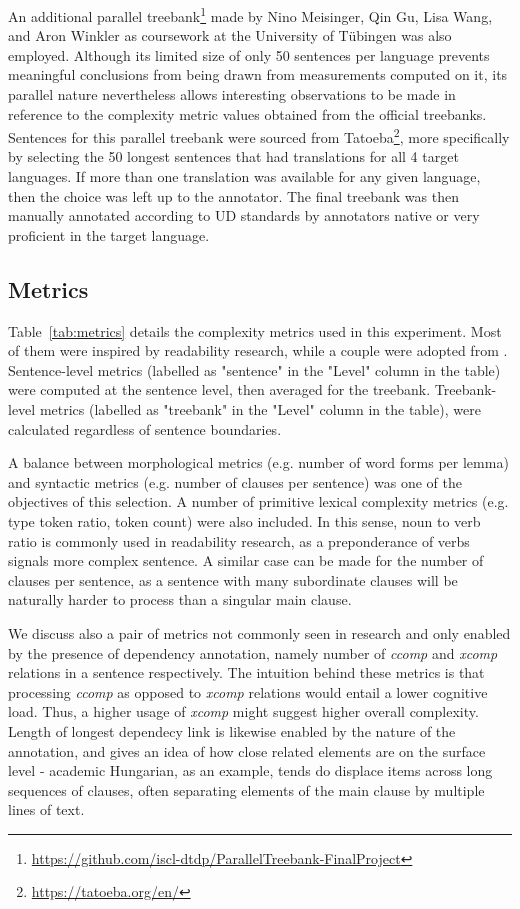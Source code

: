 \documentclass[11pt]{article}
\begin{document}
An additional parallel treebank\footnote{\url{https://github.com/iscl-dtdp/ParallelTreebank-FinalProject}} made by Nino Meisinger, Qin Gu, Lisa Wang, and Aron Winkler as coursework at the University of Tübingen was also employed. Although its limited size of only 50 sentences per language prevents meaningful conclusions from being drawn from measurements computed on it, its parallel nature nevertheless allows interesting observations to be made in reference to the complexity metric values obtained from the official treebanks. Sentences for this parallel treebank were sourced from Tatoeba\footnote{\url{https://tatoeba.org/en/}}, more specifically by selecting the 50 longest sentences that had translations for all 4 target languages. If more than one translation was available for any given language, then the choice was left up to the annotator. The final treebank was then manually annotated according to UD standards by annotators native or very proficient in the target language.

\subsection{Metrics}



Table~\ref{tab:metrics} details the complexity metrics used in this experiment. Most of them were inspired by readability research, while a couple were adopted from \citep{berdicevskis-etal-2018-using}. Sentence-level metrics (labelled as "sentence" in the "Level" column in the table) were computed at the sentence level, then averaged for the treebank. Treebank-level metrics (labelled as "treebank" in the "Level" column in the table), were calculated regardless of sentence boundaries.

A balance between morphological metrics (e.g. number of word forms per lemma) and syntactic metrics (e.g. number of clauses per sentence) was one of the objectives of this selection. A number of primitive lexical complexity metrics (e.g. type token ratio, token count) were also included. In this sense, noun to verb ratio is commonly used in readability research, as a preponderance of verbs signals more complex sentence. A similar case can be made for the number of clauses per sentence, as a sentence with many subordinate clauses will be naturally harder to process than a singular main clause.

We discuss also a pair of metrics not commonly seen in research and only enabled by the presence of dependency annotation, namely number of \emph{ccomp} and \emph{xcomp} relations in a sentence respectively. The intuition behind these metrics is that processing \emph{ccomp} as opposed to \emph{xcomp} relations would entail a lower cognitive load. Thus, a higher usage of \emph{xcomp} might suggest higher overall complexity. Length of longest dependecy link is likewise enabled by the nature of the annotation, and gives an idea of how close related elements are on the surface level - academic Hungarian, as an example, tends do displace items across long sequences of clauses, often separating elements of the main clause by multiple lines of text.
\end{document}
